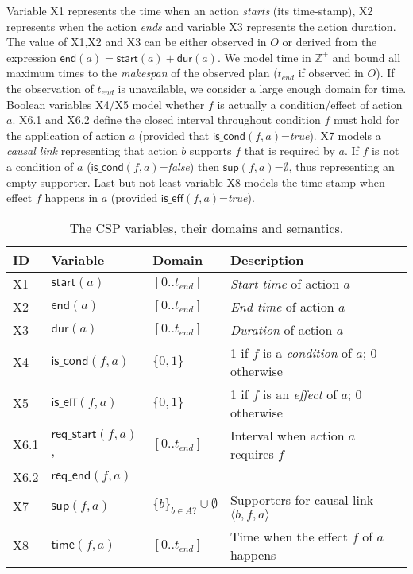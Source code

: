 \documentclass{ecai}
\newcommand{\tup}[1]{{\langle #1 \rangle}}
\newcommand{\dur}{\mathsf{dur}}    %
\newcommand{\iscond}{\mathsf{is\_cond}}    %
\newcommand{\iseff}{\mathsf{is\_eff}}    %
\newcommand{\start}{\mathsf{start}}%
\newcommand{\en}{\mathsf{end}}     %
\newcommand{\supp}{\mathsf{sup}}   %
\newcommand{\tim}{\mathsf{time}}   %
\newcommand{\reqs}{\mathsf{req\_{start}}} %
\newcommand{\reqe}{\mathsf{req\_{end}}}   %
\begin{document}
Variable X1 represents the time when an action {\em starts} (its time-stamp), X2 represents when the action {\em ends} and variable X3 represents the action duration. The value of X1,X2 and X3 can be either observed in $O$ or derived from the expression $\en(a)=\start(a)+\dur(a)$. We  model time in $\mathbb{Z}^+$ and bound all maximum times to the {\em makespan} of the observed plan ($t_{end}$ if observed in $O$). If the observation of $t_{end}$ is unavailable, we consider a large enough domain for time. Boolean variables X4/X5 model whether $f$ is actually a condition/effect of action $a$. X6.1 and X6.2 define the closed interval throughout condition $f$ must hold for the application of action $a$ (provided that $\iscond(f,a)$=\textit{true}). X7 models a {\em causal link} representing that action $b$ supports $f$ that is required by $a$. If $f$ is not a condition of $a$ ($\iscond(f,a)$=\textit{false}) then $\supp(f,a)$=$\emptyset$, thus representing an empty supporter. Last but not least variable X8 models the time-stamp when effect $f$ happens in $a$ (provided $\iseff(f,a)$=\textit{true}).

\begin{table}
\begin{center}
\caption{The CSP variables, their domains and semantics.}
\begin{scriptsize}
\begin{tabular}{llll}
\hline	
{\bf ID} & {\bf Variable} & {\bf Domain} & {\bf Description} \\
\hline
X1 &$\start(a)$ & $[0..t_{end}]$ & {\em Start time} of action $a$ \\
X2 &$\en(a)$ & $[0..t_{end}]$ & {\em End time} of action $a$ \\
X3 &$\dur(a)$ & $[0..t_{end}]$ & {\em Duration} of action $a$ \\

X4 &$\iscond(f,a)$ & $\{0,1\}$ & 1 if $f$ is a {\em condition} of $a$; 0 otherwise \\
X5 &$\iseff(f,a)$ & $\{0,1\}$ & 1 if $f$ is an {\em effect} of $a$; 0 otherwise \\

X6.1 &$\reqs(f,a)$, & $[0..t_{end}]$ & Interval when action $a$ requires $f$\\ 
X6.2 &$\reqe(f,a)$  &  & \\

X7 &$\supp(f,a)$ & $\{b\}_{b\in A?} \cup \emptyset $&  Supporters for causal link $\tup{b,f,a}$ \\ 
X8 &$\tim(f,a)$ & $[0..t_{end}]$ & Time when the effect $f$ of $a$ happens
\end{tabular}
\end{scriptsize}
\label{table:variables}
\end{center}
\end{table}
\end{document}
